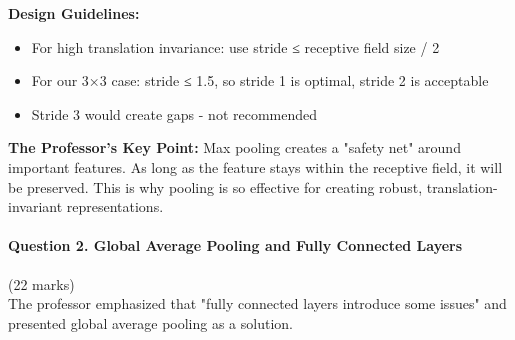\documentclass[12pt]{article}
\newcommand{\explanation}[1]{{\color{explanationcolor}#1}}
\begin{document}
\begin{enumerate}[(a)]
{{    \textbf{Design Guidelines:}
    \begin{itemize}
        \item For high translation invariance: use stride ≤ receptive field size / 2
        \item For our 3×3 case: stride ≤ 1.5, so stride 1 is optimal, stride 2 is acceptable
        \item Stride 3 would create gaps - not recommended
    \end{itemize}
    }
    
    \textbf{The Professor's Key Point:}
    \explanation{
    Max pooling creates a "safety net" around important features. As long as the feature stays within the receptive field, it will be preserved. This is why pooling is so effective for creating robust, translation-invariant representations.
    }
    }
\end{enumerate}

\newpage
\paragraph{Question 2. Global Average Pooling and Fully Connected Layers}{\hfill (22 marks)}\\
The professor emphasized that "fully connected layers introduce some issues" and presented global average pooling as a solution.
\end{document}
